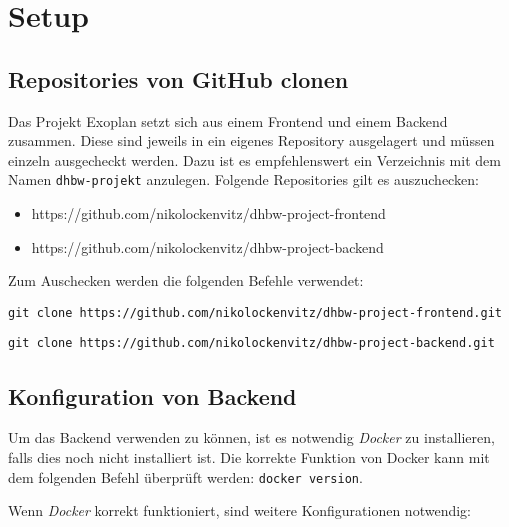 \section{Setup}
\subsection{Repositories von GitHub clonen}

Das Projekt Exoplan setzt sich aus einem Frontend und einem Backend zusammen. Diese sind jeweils in ein eigenes Repository ausgelagert und müssen einzeln ausgecheckt werden. Dazu ist es empfehlenswert ein Verzeichnis mit dem Namen \texttt{dhbw-projekt} anzulegen. Folgende Repositories gilt es auszuchecken:
\begin{itemize}
	\item https://github.com/nikolockenvitz/dhbw-project-frontend
	\item https://github.com/nikolockenvitz/dhbw-project-backend
\end{itemize}

Zum Auschecken werden die folgenden Befehle verwendet:

\texttt{git clone https://github.com/nikolockenvitz/dhbw-project-frontend.git}

\texttt{git clone https://github.com/nikolockenvitz/dhbw-project-backend.git}

\subsection{Konfiguration von Backend}

Um das Backend verwenden zu können, ist es notwendig \textit{Docker} zu installieren, falls dies noch nicht installiert ist. Die korrekte Funktion von Docker kann mit dem folgenden Befehl überprüft werden: \texttt{docker version}.

Wenn \textit{Docker} korrekt funktioniert, sind weitere Konfigurationen notwendig:

